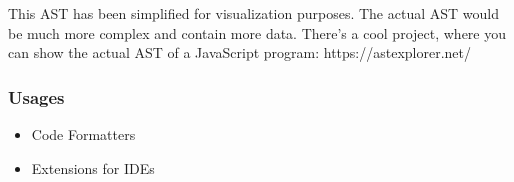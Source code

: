 This AST has been simplified for visualization purposes. The actual AST would be much more complex and contain more data. There's a cool project, where you can show the actual AST of a JavaScript program: https://astexplorer.net/


\subsubsection{Usages}

\begin{itemize}
    \item Code Formatters
    \item Extensions for IDEs
\end{itemize}

